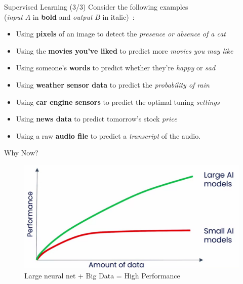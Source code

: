 \documentclass[pdf]{beamer}
\theoremstyle{mystyle}
\begin{document}
\begin{frame}{Supervised Learning (3/3)}
	Consider the following examples \\
	(\textit{input} $A$ in \textbf{bold} and \textit{output} $B$ in italic)~\citep{trask2019grokking}:
	\begin{itemize}
		\item<2-> Using \textbf{pixels} of an image to detect the \textit{presence or absence of a cat}
		\item<3-> Using the \textbf{movies you've liked} to predict more \textit{movies you may like}
		\item<4-> Using someone's \textbf{words} to predict whether they're \textit{happy} or \textit{sad} 
		\item<5-> Using \textbf{weather sensor data} to predict the \textit{probability of rain}
		\item<6-> Using \textbf{car engine sensors} to predict the optimal tuning \textit{settings}
		\item<7-> Using \textbf{news data} to predict tomorrow's stock \textit{price}
		\item<8-> Using a raw \textbf{audio file} to predict a \textit{transcript} of the audio.
	\end{itemize}	
\end{frame}

\begin{frame}{Why Now?}
	\begin{figure}[!ht]
		\centering
		\includegraphics[scale=.2]{images/big-data}
		\caption{Large neural net + Big Data = High Performance \citep{ng2023generative}}
		\label{fig:big-data}
	\end{figure}
\end{frame}
\end{document}
